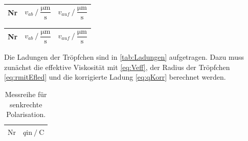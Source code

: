 \begin{table}[H]
\begin{minipage}[t]{0.45\textwidth}
\begin{table}[H]
\begin{tabular}{S S S}
            \bottomrule
          \end{tabular}
        \end{table}
      
  \end{minipage}\qquad
  \begin{minipage}[t]{0.45\textwidth}
      \small
      \label{stab:v225}
      \begin{table}[H]
          \centering
          \begin{tabular}{S S S}
            \toprule
              {Nr}& {$ v_{ab} \mathbin{/} \dfrac{\unit{\micro\meter}}{\unit{\second}}$}&{$ v_{auf} \mathbin{/} \dfrac{\unit{\micro\meter}}{\unit{\second}}$}\\
            \midrule
            
            \bottomrule
          \end{tabular}
        \end{table}
      
  \end{minipage}\qquad
  \begin{minipage}[t]{0.45\textwidth}
      \small
      \label{stab:v250}
      \begin{table}[H]
          \centering
          \begin{tabular}{S S S}
            \toprule
              {Nr}& {$ v_{ab} \mathbin{/} \dfrac{\unit{\micro\meter}}{\unit{\second}}$}&{$ v_{auf} \mathbin{/} \dfrac{\unit{\micro\meter}}{\unit{\second}}$}\\
            \midrule
            
            \bottomrule
          \end{tabular}
        \end{table}
  \end{minipage}
\end{table}

Die Ladungen der Tröpfchen sind in \autoref{tab:Ladungen} aufgetragen. Dazu muss zunächst die effektive Viskosität mit \eqref{eq:Veff}, der Radius der Tröpfchen \eqref{eq:rmitEfled} und die korrigierte Ladung \eqref{eq:qKorr} berechnet werden.

\begin{table}[H]
  \centering
  \caption{Messreihe für senkrechte Polarisation.}
  \label{tab:Messung1}
  \begin{tabular}{S S}
    \toprule
      {$\text{Nr}$} & {$q \text{in} \mathbin{/} \unit{\coulomb}$}\\
    \midrule

    \bottomrule
  \end{tabular}
\end{table}

